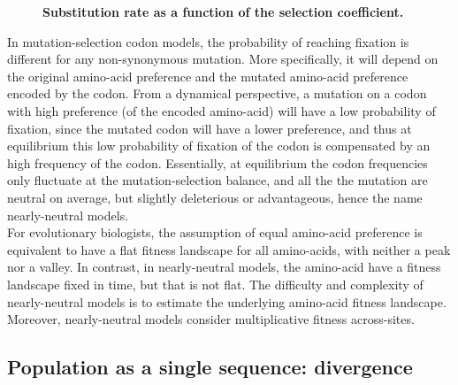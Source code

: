\documentclass{article}
\newcommand{\mutmatrix}{R}
\newcommand{\ci}{{\color{RED}{i}}}
\newcommand{\cj}{{\color{GREEN}{j}}}
\newcommand{\itoj}{\ci, \cj}
\newcommand{\nucitoj}{\mathcal{M}(\itoj)}
\newcommand{\submatrix}{Q}
\newcommand{\aai}{\mathcal{A}(\ci)}
\newcommand{\aaj}{\mathcal{A}(\cj)}
\newcommand{\scaledfit}{F}
\newcommand{\scaledfiti}{\scaledfit_{\aai}}
\newcommand{\scaledfitj}{\scaledfit_{\aaj}}
\begin{document}
\begin{figure}[H]
	\centering
	\caption{\textbf{Substitution rate as a function of the selection coefficient.}}
\end{figure}


In mutation-selection codon models, the probability of reaching fixation is different for any non-synonymous mutation.
More specifically, it will depend on the original amino-acid preference and the mutated amino-acid preference encoded by the codon.
From a dynamical perspective, a mutation on a codon with high preference (of the encoded amino-acid) will have a low probability of fixation, since the mutated codon will have a lower preference, and thus at equilibrium this low probability of fixation of the codon is compensated by an high frequency of the codon.
Essentially, at equilibrium the codon frequencies only fluctuate at the mutation-selection balance, and all the the mutation are neutral on average, but slightly deleterious or advantageous, hence the name nearly-neutral models.\\

For evolutionary biologists, the assumption of equal amino-acid preference is equivalent to have a flat fitness landscape for all amino-acids, with neither a peak nor a valley.
In contrast, in nearly-neutral models, the amino-acid have a fitness landscape fixed in time, but that is not flat.
The difficulty and complexity of nearly-neutral models is to estimate the underlying amino-acid fitness landscape.
Moreover, nearly-neutral models consider multiplicative fitness across-sites.

\subsection{Population as a single sequence: divergence}
\end{document}
